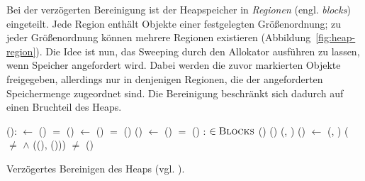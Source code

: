 Bei der verzögerten Bereinigung ist der Heapspeicher in \textit{Regionen} (engl. \textit{blocks}) eingeteilt.
Jede Region enthält Objekte einer festgelegten Größenordnung; zu jeder Größenordnung können mehrere Regionen existieren (Abbildung~\ref{fig:heap-region}).
Die Idee ist nun, das Sweeping durch den Allokator ausführen zu lassen, wenn Speicher angefordert wird.
Dabei werden die zuvor markierten Objekte freigegeben, allerdings nur in denjenigen Regionen, die der angeforderten Speichermenge zugeordnet sind.
Die Bereinigung beschränkt sich dadurch auf einen Bruchteil des Heaps.

\begin{algorithm}[h]
\begin{algorithmic}[1]
	\State {}():
	\State \quad {} $\gets$ ()
	\State \quad \IF {} $=$ \Null
	\State \quad \quad {}()	
	\State \quad \quad {} $\gets$ ()	
	\State \quad \quad \IF {} $=$ \Null
	\State \quad \quad \quad {}()		
	\State \quad \quad \quad {}()	
	\State \quad \quad \quad {} $\gets$ ()	
	\State \quad \quad \quad \IF {} $=$ \Null
	\State \quad \quad \quad \quad {}()
	\State \quad \Return {}
	\Statex
	\State {}:
	\State \quad {}		
	\State \quad \FOREACH {} $\in \textsc{Blocks}$
	\State \quad \quad \IF {}()
	\State \quad \quad \quad {}()	
	\State \quad \quad \ELSE {}(, )
	\Statex
	\State {}()
	\State \quad \Do
	\State \quad \quad {} $\gets$ (, )
	\State \quad \quad \IF ( $\neq$ \Null $\wedge$ ((), ()))
	\State \quad \quad \quad \Return	{}
	\State \quad \WHILE {} $\neq$ 
	\State \quad {}()	
\end{algorithmic}
\caption[Verzögertes Bereinigen des Heaps]{Verzögertes Bereinigen des Heaps (vgl. \cite[S. 25]{handbook}).}
\label{algo:lazy-sweep}
\end{algorithm}


